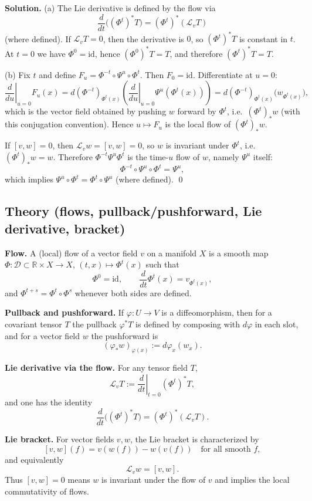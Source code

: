 \documentclass[12pt,a4paper]{article}
\theoremstyle{plain}
\theoremstyle{definition}      %
\begin{document}
\textbf{Solution.}
(a) The Lie derivative is defined by the flow via
\[
\frac{d}{dt}\big((\Phi^t)^*T\big) = (\Phi^t)^*(\mathcal L_v T)
\]
(where defined). If $\mathcal L_v T=0$, then the derivative is $0$, so $(\Phi^t)^*T$ is constant in $t$.
At $t=0$ we have $\Phi^0=\mathrm{id}$, hence $(\Phi^0)^*T=T$, and therefore $(\Phi^t)^*T=T$.

(b) Fix $t$ and define $F_u=\Phi^{-t}\circ \Psi^u\circ \Phi^t$. Then $F_0=\mathrm{id}$.
Differentiate at $u=0$:
\[
\left.\frac{d}{du}\right|_{u=0}F_u(x)
= d(\Phi^{-t})_{\Phi^t(x)}\!\left(\left.\frac{d}{du}\right|_{u=0}\Psi^u(\Phi^t(x))\right)
= d(\Phi^{-t})_{\Phi^t(x)}\big(w_{\Phi^t(x)}\big),
\]
which is the vector field obtained by pushing $w$ forward by $\Phi^t$, i.e.\ $(\Phi^t)_*w$ (with this
conjugation convention). Hence $u\mapsto F_u$ is the local flow of $(\Phi^t)_*w$.

If $[v,w]=0$, then $\mathcal L_v w=[v,w]=0$, so $w$ is invariant under $\Phi^t$, i.e.\ $(\Phi^t)_*w=w$.
Therefore $\Phi^{-t}\Psi^u\Phi^t$ is the time-$u$ flow of $w$, namely $\Psi^u$ itself:
\[
\Phi^{-t}\circ \Psi^u\circ \Phi^t = \Psi^u,
\]
which implies $\Psi^u\circ \Phi^t = \Phi^t\circ \Psi^u$ (where defined). \qed

\subsection*{Theory (flows, pullback/pushforward, Lie derivative, bracket)}

\textbf{Flow.}
A (local) flow of a vector field $v$ on a manifold $X$ is a smooth map
$\Phi:\mathcal D\subset\mathbb R\times X\to X$, $(t,x)\mapsto \Phi^t(x)$ such that
\[
\Phi^0=\mathrm{id},\qquad \frac{d}{dt}\Phi^t(x)=v_{\Phi^t(x)},
\]
and $\Phi^{t+s}=\Phi^t\circ \Phi^s$ whenever both sides are defined.

\textbf{Pullback and pushforward.}
If $\varphi:U\to V$ is a diffeomorphism, then for a covariant tensor $T$ the pullback $\varphi^*T$
is defined by composing with $d\varphi$ in each slot, and for a vector field $w$ the pushforward is
\[
(\varphi_*w)_{\varphi(x)} := d\varphi_x(w_x).
\]

\textbf{Lie derivative via the flow.}
For any tensor field $T$,
\[
\mathcal L_v T := \left.\frac{d}{dt}\right|_{t=0}(\Phi^t)^*T,
\]
and one has the identity
\[
\frac{d}{dt}\big((\Phi^t)^*T\big) = (\Phi^t)^*(\mathcal L_v T).
\]

\textbf{Lie bracket.}
For vector fields $v,w$, the Lie bracket is characterized by
\[
[v,w](f)=v(w(f))-w(v(f)) \quad \text{for all smooth } f,
\]
and equivalently
\[
\mathcal L_v w = [v,w].
\]
Thus $[v,w]=0$ means $w$ is invariant under the flow of $v$ and implies the local commutativity of flows.
\end{document}
